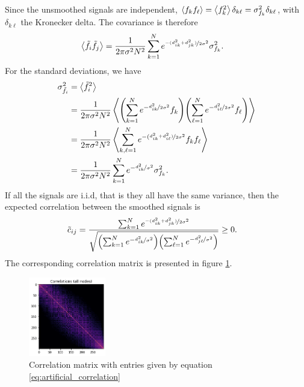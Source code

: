 \documentclass{article}
\begin{document}
\begin{multicols}{2}
\begin{align*}
\end{align*}
Since the unsmoothed signals are independent, $\expval{f_kf_\ell} = \expval{f_k^2}\delta_{k\ell} = \sigma_{f_k}^2\delta_{k\ell}$, with $\delta_{k\ell}$ the Kronecker delta. The covariance is therefore
\begin{align*}
    \expval{\Tilde{f}_i\Tilde{f}_j} &= \frac{1}{2\pi\sigma^2N^2}\sum_{k = 1}^N e^{\nicefrac{-(d_{ik}^2+d_{jk}^2)}{2\sigma^2}}\sigma_{f_k}^2.
\end{align*}
For the standard deviations, we have
\begin{align*}
    \sigma^2_{\Tilde{f}_i} &= \expval{\Tilde{f}_i^2}\\
    &= \frac{1}{2\pi\sigma^2N^2}\expval{\qty(\sum_{k=1}^N e^{-\nicefrac{d_{ik}^2}{2\sigma^2}}f_k)\qty(\sum_{\ell=1}^N e^{-\nicefrac{d_{i\ell}^2}{2\sigma^2}}f_\ell)}\\
    &= \frac{1}{2\pi\sigma^2N^2}\expval{\sum_{k, \ell =1}^N e^{-(\nicefrac{d_{ik}^2 + d_{i\ell}^2)}{2\sigma^2}}f_kf_\ell}\\
    &= \frac{1}{2\pi\sigma^2N^2}\sum_{k=1}^N e^{-\nicefrac{d_{ik}^2}{\sigma^2}}\sigma_{f_k}^2.
\end{align*}
If all the signals are i.i.d, that is they all have the same variance, then the expected correlation between the smoothed signals is
\begin{align}
    \Tilde{c}_{ij} &= \frac{\sum_{k = 1}^N e^{\nicefrac{-(d_{ik}^2+d_{jk}^2)}{2\sigma^2}}}{\sqrt{\qty(\sum_{k=1}^N e^{-\nicefrac{d_{ik}^2}{\sigma^2}})\qty(\sum_{\ell=1}^N e^{-\nicefrac{d_{j\ell}^2}{\sigma^2}})}} \geq 0.
    \label{eq:artificial_correlation}
\end{align}
The corresponding correlation matrix is presented in figure \ref{fig:correlation matrix}.

\begin{figure}[H]
    \centering    
    \includegraphics[width=0.3\textwidth]{figures/Theoretical correlations.png}
    \caption{Correlation matrix with entries given by equation \ref{eq:artificial_correlation}}
    \label{fig:correlation matrix}
\end{figure}


\end{multicols}
\end{document}

